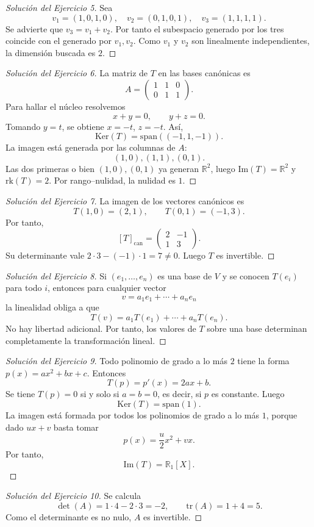 \documentclass[10pt,a4paper,oneside]{article}
\theoremstyle{plain}
\theoremstyle{definition}
\theoremstyle{remark}
\newcommand{\R}{\mathbb{R}}
\newcommand{\Ker}{\mathrm{Ker}}
\newcommand{\Ima}{\mathrm{Im}}
\newcommand{\rk}{\mathrm{rk}}
\newcommand{\tr}{\mathrm{tr}}
\newcommand{\Span}{\mathrm{span}}
\begin{document}
\begin{proof}[Solución del Ejercicio 5]
Sea
\[v_1=(1,0,1,0),\quad v_2=(0,1,0,1),\quad v_3=(1,1,1,1).
\]
Se advierte que \(v_3=v_1+v_2\). Por tanto el subespacio generado por los tres coincide con el generado por \(v_1,v_2\). Como \(v_1\) y \(v_2\) son linealmente independientes, la dimensión buscada es \(2\).
\end{proof}
\begin{proof}[Solución del Ejercicio 6]
La matriz de \(T\) en las bases canónicas es
\[
A=\begin{pmatrix}1&1&0\\0&1&1\end{pmatrix}.
\]
Para hallar el núcleo resolvemos
\[x+y=0,\qquad y+z=0.
\]
Tomando \(y=t\), se obtiene \(x=-t\), \(z=-t\). Así,
\[\Ker(T)=\Span((-1,1,-1)).
\]
La imagen está generada por las columnas de \(A\):
\[(1,0),(1,1),(0,1).
\]
Las dos primeras o bien \((1,0),(0,1)\) ya generan \(\R^2\), luego \(\Ima(T)=\R^2\) y \(\rk(T)=2\). Por rango--nulidad, la nulidad es \(1\).
\end{proof}
\begin{proof}[Solución del Ejercicio 7]
La imagen de los vectores canónicos es
\[T(1,0)=(2,1),\qquad T(0,1)=(-1,3).
\]
Por tanto,
\[
[T]_{\mathrm{can}}=\begin{pmatrix}2&-1\\1&3\end{pmatrix}.
\]
Su determinante vale \(2\cdot 3-(-1)\cdot1=7\neq0\). Luego \(T\) es invertible.
\end{proof}
\begin{proof}[Solución del Ejercicio 8]
Si \((e_1,\dots,e_n)\) es una base de \(V\) y se conocen \(T(e_i)\) para todo \(i\), entonces para cualquier vector
\[v=a_1e_1+\cdots+a_ne_n
\]
la linealidad obliga a que
\[T(v)=a_1T(e_1)+\cdots+a_nT(e_n).
\]
No hay libertad adicional. Por tanto, los valores de \(T\) sobre una base determinan completamente la transformación lineal.
\end{proof}
\begin{proof}[Solución del Ejercicio 9]
Todo polinomio de grado a lo más \(2\) tiene la forma \(p(x)=ax^2+bx+c\). Entonces
\[T(p)=p'(x)=2ax+b.
\]
Se tiene \(T(p)=0\) si y solo si \(a=b=0\), es decir, si \(p\) es constante. Luego
\[\Ker(T)=\Span(1).
\]
La imagen está formada por todos los polinomios de grado a lo más \(1\), porque dado \(ux+v\) basta tomar
\[p(x)=\frac{u}{2}x^2+vx.
\]
Por tanto,
\[\Ima(T)=\R_1[X].
\]
\end{proof}
\begin{proof}[Solución del Ejercicio 10]
Se calcula
\[\det(A)=1\cdot 4-2\cdot 3=-2,
\qquad
\tr(A)=1+4=5.
\]
Como el determinante es no nulo, \(A\) es invertible.
\end{proof}
\end{document}
